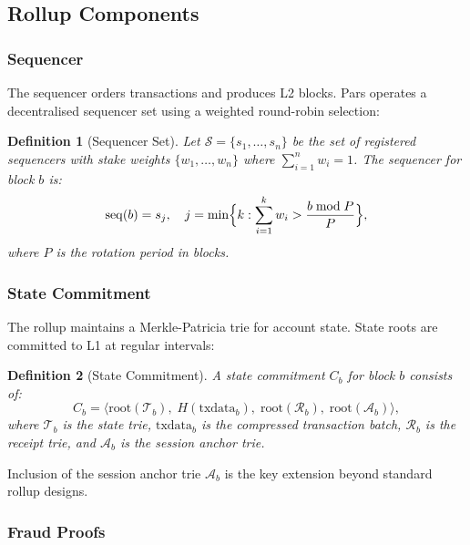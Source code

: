 \documentclass[11pt,a4paper]{article}
\newtheorem{definition}{Definition}[section]
\begin{document}
\subsection{Rollup Components}

\subsubsection{Sequencer}

The sequencer orders transactions and produces L2 blocks.  Pars operates a
decentralised sequencer set using a weighted round-robin selection:

\begin{definition}[Sequencer Set]
    Let $\mathcal{S} = \{s_1, \dots, s_n\}$ be the set of registered
    sequencers with stake weights $\{w_1, \dots, w_n\}$ where
    $\sum_{i=1}^n w_i = 1$.  The sequencer for block $b$ is:
    \[
        \mathrm{seq}(b) = s_j, \quad
        j = \min\Bigl\{k : \sum_{i=1}^k w_i
            > \frac{b \bmod P}{P}\Bigr\},
    \]
    where $P$ is the rotation period in blocks.
\end{definition}

\subsubsection{State Commitment}

The rollup maintains a Merkle-Patricia trie for account state.  State roots
are committed to L1 at regular intervals:

\begin{definition}[State Commitment]
    A state commitment $C_b$ for block $b$ consists of:
    \[
        C_b = \bigl\langle
            \mathrm{root}(\mathcal{T}_b),\;
            H(\mathrm{txdata}_b),\;
            \mathrm{root}(\mathcal{R}_b),\;
            \mathrm{root}(\mathcal{A}_b)
        \bigr\rangle,
    \]
    where $\mathcal{T}_b$ is the state trie, $\mathrm{txdata}_b$ is the
    compressed transaction batch, $\mathcal{R}_b$ is the receipt trie, and
    $\mathcal{A}_b$ is the session anchor trie.
\end{definition}

Inclusion of the session anchor trie $\mathcal{A}_b$ is the key extension
beyond standard rollup designs.

\subsubsection{Fraud Proofs}
\end{document}
